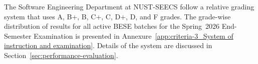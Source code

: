 The Software Engineering Department at NUST-SEECS follow a relative grading system that uses A, B+, B, C+, C, D+, D, and F grades. The grade-wise distribution of results for all active BESE batches for the Spring~2026 End-Semester Examination is presented in Annexure~\ref{app:criteria-3_System of instruction and examination}. Details of the system are discussed in Section~\ref{sec:performance-evaluation}.

